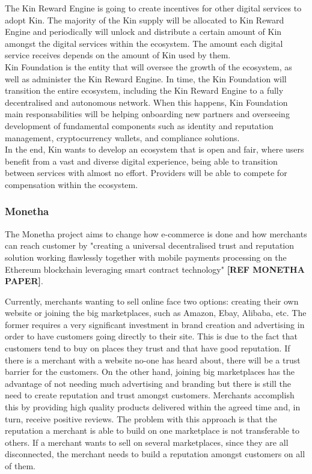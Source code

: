 The Kin Reward Engine is going to create incentives for other digital services to adopt Kin. The majority of the Kin supply will be allocated to Kin Reward Engine and periodically will unlock and distribute a certain amount of Kin amongst the digital services within the ecosystem. The amount each digital service receives depends on the amount of Kin used by them. \\

Kin Foundation is the entity that will oversee the growth of the ecosystem, as well as administer the Kin Reward Engine. In time, the Kin Foundation will transition the entire ecosystem, including the Kin Reward Engine to a fully decentralised and autonomous network. When this happens, Kin Foundation main responsabilities will be helping onboarding new partners and overseeing development of fundamental components such as identity and reputation management, cryptocurrency wallets, and compliance solutions. \\

In the end, Kin wants to develop an ecosystem that is open and fair, where users benefit from a vast and diverse digital experience, being able to transition between services with almost no effort. Providers will be able to compete for compensation within the ecosystem.

\subsubsection{Monetha}

The Monetha project aims to change how e-commerce is done and how merchants can reach customer by "creating a universal decentralised trust and reputation solution working flawlessly together with mobile payments processing on the Ethereum blockchain leveraging smart contract technology" \textbf{[REF MONETHA PAPER]}.

Currently, merchants wanting to sell online face two options: creating their own website or joining the big marketplaces, such as Amazon, Ebay, Alibaba, etc. The former requires a very significant investment in brand creation and advertising in order to have customers going directly to their site. This is due to the fact that customers tend to buy on places they trust and that have good reputation. If there is a merchant with a website no-one has heard about, there will be a trust barrier for the customers. On the other hand, joining big marketplaces has the advantage of not needing much advertising and branding but there is still the need to create reputation and trust amongst customers. Merchants accomplish this by providing high quality products delivered within the agreed time and, in turn, receive positive reviews. The problem with this approach is that the reputation a merchant is able to build on one marketplace is not transferable to others. If a merchant wants to sell on several marketplaces, since they are all disconnected, the merchant needs to build a reputation amongst customers on all of them.

